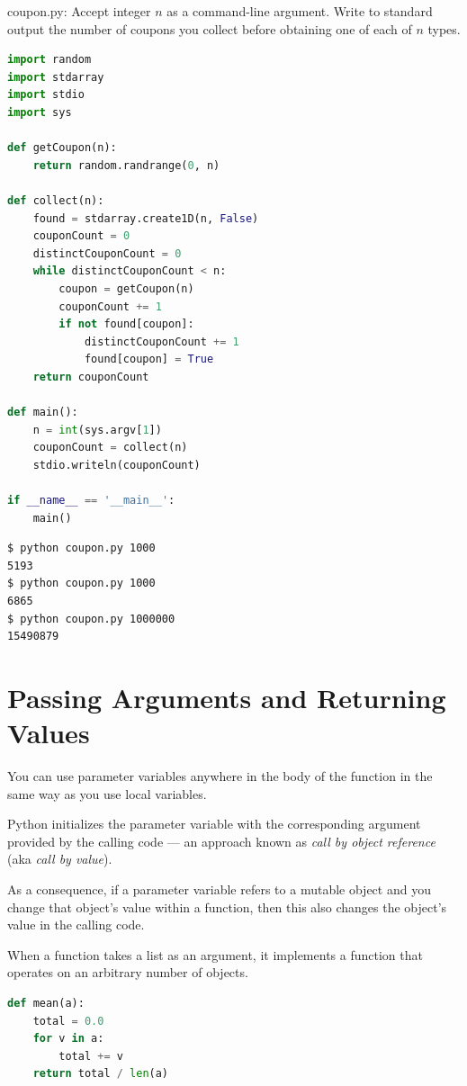 \documentclass[8pt,a4paper,compress,handout]{beamer}
\begin{document}
\begin{frame}[fragile]
\begin{framed}
\tiny coupon.py: Accept integer $n$ as a command-line argument. Write to standard output the number of coupons you collect before obtaining one of each of $n$ types.
\end{framed}

\begin{lstlisting}[language=Python]
import random
import stdarray
import stdio
import sys

def getCoupon(n):
    return random.randrange(0, n)

def collect(n):
    found = stdarray.create1D(n, False)
    couponCount = 0
    distinctCouponCount = 0
    while distinctCouponCount < n:
        coupon = getCoupon(n)
        couponCount += 1
        if not found[coupon]:
            distinctCouponCount += 1
            found[coupon] = True
    return couponCount

def main():
    n = int(sys.argv[1])
    couponCount = collect(n)
    stdio.writeln(couponCount)

if __name__ == '__main__':
    main()
\end{lstlisting}
\end{frame}

\begin{frame}[fragile]
\begin{lstlisting}[language={}]
$ python coupon.py 1000
5193
$ python coupon.py 1000
6865
$ python coupon.py 1000000
15490879
\end{lstlisting}
\end{frame}

\section{Passing Arguments and Returning Values}
\begin{frame}[fragile]
You can use parameter variables anywhere in the body of the function in the same way as you use local variables. 

\bigskip

Python initializes the parameter variable with the corresponding argument provided by the calling code --- an approach known as \emph{call by object reference} (aka \emph{call by value}).

\bigskip

As a consequence, if a parameter variable refers to a mutable object and you change that object's value within a function, then this also changes the object's value in the calling code.

\bigskip

When a function takes a list as an argument, it implements a function that operates on an arbitrary number of objects. 
\begin{lstlisting}[language=Python]
def mean(a):
    total = 0.0
    for v in a:
        total += v
    return total / len(a)
\end{lstlisting}
\end{frame}
\end{document}
